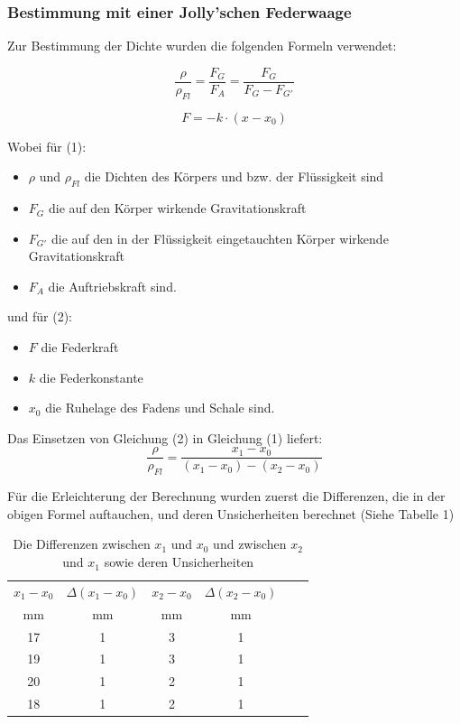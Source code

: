 \documentclass[11pt,a4paper]{article} %
\begin{document}
\subsubsection{Bestimmung mit einer Jolly'schen Federwaage}
Zur Bestimmung der Dichte wurden die folgenden Formeln verwendet:

\begin{equation}
\frac{\rho}{\rho_{Fl}} = \frac{F_{G}}{F_{A}} = \frac{F_G}{F_G - F_{G'}}
\end{equation}

\begin{equation}
F = -k\cdot(x-x_0)
\end{equation}

Wobei für (1):
\begin{itemize}
	\item $\rho$ und $\rho_{Fl}$ die Dichten des Körpers und bzw. der Flüssigkeit sind
	\item $F_G$ die auf den Körper wirkende Gravitationskraft
	\item $F_{G'}$ die auf den in der Flüssigkeit eingetauchten Körper wirkende Gravitationskraft
	\item $F_A$ die Auftriebskraft sind.
\end{itemize}

und für (2):
\begin{itemize}
	\item $F$ die Federkraft
	\item $k$ die Federkonstante
	\item $x_0$ die Ruhelage des Fadens und Schale sind.
\end{itemize}

Das Einsetzen von Gleichung (2) in Gleichung (1) liefert: 
\begin{equation}
\frac{\rho}{\rho_{Fl}} = \frac{x_1-x_0}{(x_1-x_0)-(x_2-x_0)}
\end{equation}

Für die Erleichterung der Berechnung wurden zuerst die Differenzen, die in der obigen Formel auftauchen, und deren Unsicherheiten berechnet (Siehe Tabelle 1)

\begin{table}[h]
	\begin{tabular*}{0.99\textwidth}{@{\extracolsep{\fill}}cccccc}
		\toprule
		$x_1-x_0$ & $\Delta (x_1-x_0)$ &  $x_2-x_0$  &  $\Delta(x_2-x_0)$  \\
		mm & mm &  mm & mm   \\
		\midrule
		17 & 1 & 3 & 1 \\
		19 & 1 & 3 & 1 \\
		20 & 1 & 2 & 1 \\
		18 & 1 & 2 & 1 \\
		
		\bottomrule
	\end{tabular*}
	\caption{Die Differenzen zwischen $x_1$ und $x_0$ und zwischen $x_2$ und $x_1$ sowie deren Unsicherheiten}
	\label{tabelle}
\end{table}
\end{document}
